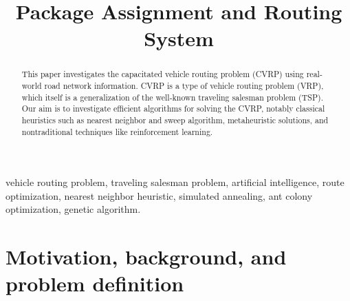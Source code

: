\documentclass[conference]{IEEEtran}
\begin{document}
\title{Package Assignment and Routing System}

\author{
    \and
    \and
}

\maketitle

\begin{abstract}
    This paper investigates the capacitated vehicle routing problem (CVRP) using real-world road network information. CVRP is a type of vehicle routing problem (VRP), which itself is a generalization of the well-known traveling salesman problem (TSP). Our aim is to investigate efficient algorithms for solving the CVRP, notably classical heuristics such as nearest neighbor and sweep algorithm, metaheuristic solutions, and nontraditional techniques like reinforcement learning.
\end{abstract}

\begin{IEEEkeywords}
    vehicle routing problem, traveling salesman problem, artificial intelligence, route optimization, nearest neighbor heuristic, simulated annealing, ant colony optimization, genetic algorithm.
\end{IEEEkeywords}

\section{Motivation, background, and problem definition}
\end{document}

